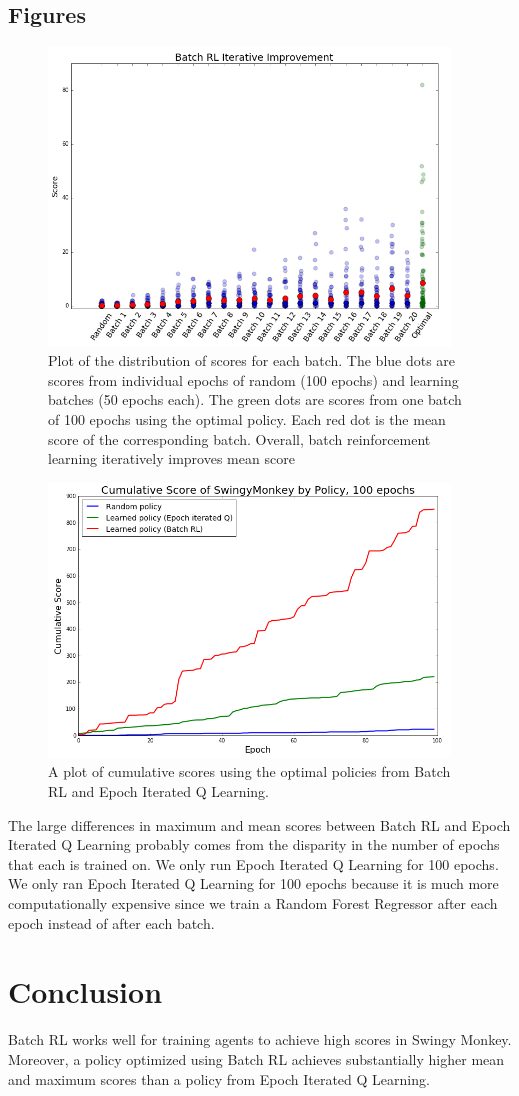 \documentclass[11pt, oneside]{article}   	%
\begin{document}
  \subsection{Figures}
  \begin{figure}[ht!]
  \centering
  \includegraphics[width=0.95\textwidth]{batch_iterative_improvement}
  \caption{Plot of the distribution of scores for each batch.  The blue dots are scores from individual epochs of random (100 epochs) and learning batches (50 epochs each).  The green dots are scores from one batch of 100 epochs using the optimal policy.  Each red dot is the mean score of the corresponding batch.  Overall, batch reinforcement learning iteratively improves mean score}
   \end{figure}
  \begin{figure}[ht!]
  \centering
  \includegraphics[width=0.95\textwidth]{cumulative_score}
  \caption{A plot of cumulative scores using the optimal policies from Batch RL and Epoch Iterated Q Learning.}
 \end{figure}  
 The large differences in maximum and mean scores between Batch RL and Epoch Iterated Q Learning probably comes from the disparity in the number of epochs that each is trained on.  We only run Epoch Iterated Q Learning for 100 epochs. We only ran Epoch Iterated Q Learning for 100 epochs because it is much more computationally expensive since we train a Random Forest Regressor after each epoch instead of after each batch.  
\section{Conclusion}
Batch RL works well for training agents to achieve high scores in Swingy Monkey.  Moreover, a policy optimized using Batch RL achieves substantially higher mean and maximum scores than a policy from Epoch Iterated Q Learning.
\end{document}
